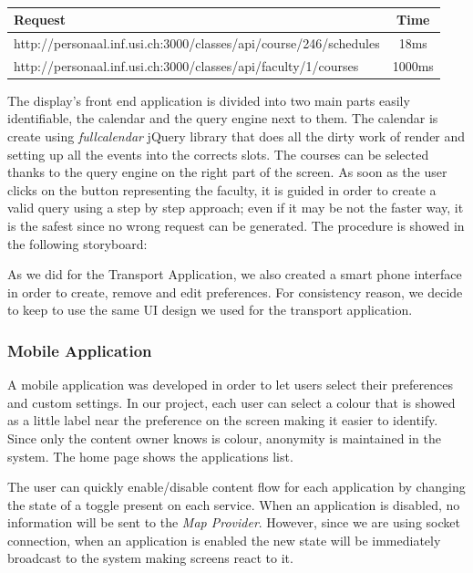 \documentclass[]{usiinfbachelorproject}
\begin{document}
\begin{table}[h]
\centering
\begin{tabular}{|l|c|}
\hline
Request & Time \\\hline
http://personaal.inf.usi.ch:3000/classes/api/course/246/schedules & 18ms \\
http://personaal.inf.usi.ch:3000/classes/api/faculty/1/courses & 1000ms\\\hline
\end{tabular}
\caption[Table caption text]{}
\label{table:classes_request}
\end{table}
The display's front end application is divided into two main parts easily identifiable, the calendar and the query engine next to them. The calendar is create using \emph{fullcalendar} jQuery library that does all the dirty work of render and setting up all the events into the corrects slots. 
The courses can be selected thanks to the query engine on the right part of the screen. As soon as the user clicks on the button representing the faculty, it is guided in order to create a valid query using a step by step approach; even if it may be not the faster way, it is the safest since no wrong request can be generated. The procedure is showed in the following storyboard:

As we did for the Transport Application, we also created a smart phone interface in order to create, remove and edit preferences. For consistency reason, we decide to keep to use the same UI design we used for the transport application.
\subsubsection{Mobile Application}

A mobile application was developed in order to let users select their preferences and custom settings. In our project, each user can select a colour that is showed as a little label near the preference on the screen making it easier to identify. Since only the content owner knows is colour, anonymity is maintained in the system. The home page shows the applications list.

The user can quickly enable/disable content flow for each application by changing the state of a toggle present on each service. When an application is disabled, no information will be sent to the \emph{Map Provider}. However, since we are using socket connection, when an application is enabled the new state will be immediately broadcast to the system making screens react to it.
\end{document}
